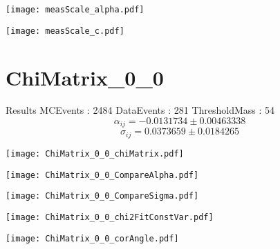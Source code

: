 \documentclass[a4paper,12pt]{article}
\begin{document}
\begin{minipage}{0.49\linewidth} 
\texttt{[image: measScale\_alpha.pdf]}\\
\end{minipage}
\hfill
\begin{minipage}{0.49\linewidth} 
\texttt{[image: measScale\_c.pdf]}\\
\end{minipage}
\clearpage
\section{ChiMatrix\_0\_0}
\begin{minipage}{0.49\linewidth} Results \newline
MCEvents : 2484\newline
DataEvents : 281 \newline
ThresholdMass : 54\\
$$\alpha_{ij} = -0.0131734\pm 0.00463338$$
$$\sigma_{ij} = 0.0373659\pm 0.0184265$$
\end{minipage}\hfill
\begin{minipage}{0.49\linewidth} 
\texttt{[image: ChiMatrix\_0\_0\_chiMatrix.pdf]}\\
\end{minipage}
\hfill
\begin{minipage}{0.49\linewidth} 
\texttt{[image: ChiMatrix\_0\_0\_CompareAlpha.pdf]}\\
\end{minipage}
\hfill
\begin{minipage}{0.49\linewidth} 
\texttt{[image: ChiMatrix\_0\_0\_CompareSigma.pdf]}\\
\end{minipage}
\begin{minipage}{0.49\linewidth} 
\texttt{[image: ChiMatrix\_0\_0\_chi2FitConstVar.pdf]}\\
\end{minipage}
\hfill
\begin{minipage}{0.49\linewidth} 
\texttt{[image: ChiMatrix\_0\_0\_corAngle.pdf]}\\
\end{minipage}
\end{document}
